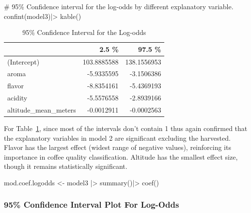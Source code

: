 \documentclass[
  letterpaper,
  DIV=11,
  numbers=noendperiod]{scrartcl}
\newenvironment{Shaded}{\begin{snugshade}}{\end{snugshade}}
\newcommand{\CommentTok}[1]{\textcolor[rgb]{0.37,0.37,0.37}{#1}}
\newcommand{\FunctionTok}[1]{\textcolor[rgb]{0.28,0.35,0.67}{#1}}
\newcommand{\NormalTok}[1]{\textcolor[rgb]{0.00,0.23,0.31}{#1}}
\newcommand{\OtherTok}[1]{\textcolor[rgb]{0.00,0.23,0.31}{#1}}
\newcommand{\SpecialCharTok}[1]{\textcolor[rgb]{0.37,0.37,0.37}{#1}}
\begin{document}
\begin{Shaded}
\begin{Highlighting}[]
\CommentTok{\# 95\% Confidence interval for the log{-}odds by different explanatory variable.}
\FunctionTok{confint}\NormalTok{(model3)}\SpecialCharTok{|\textgreater{}}
  \FunctionTok{kable}\NormalTok{()}
\end{Highlighting}
\end{Shaded}

\begin{longtable}[]{@{}lrr@{}}

\caption{\label{tbl-logoddsCI}95\% Confidence Interval for the Log-odds}

\tabularnewline

\toprule\noalign{}
& 2.5 \% & 97.5 \% \\
\midrule\noalign{}
\endhead
\bottomrule\noalign{}
\endlastfoot
(Intercept) & 103.8885588 & 138.1556953 \\
aroma & -5.9335595 & -3.1506386 \\
flavor & -8.8354161 & -5.4369193 \\
acidity & -5.5576558 & -2.8939166 \\
altitude\_mean\_meters & -0.0012911 & -0.0002563 \\

\end{longtable}

For Table~\ref{tbl-logoddsCI}, since most of the intervals don't contain
1 thus again confirmed that the explanatory variables in model 2 are
significant excluding the harvested. Flavor has the largest effect
(widest range of negative values), reinforcing its importance in coffee
quality classification. Altitude has the smallest effect size, though it
remains statistically significant.

\begin{Shaded}
\begin{Highlighting}[]
\NormalTok{mod.coef.logodds }\OtherTok{\textless{}{-}}\NormalTok{ model3 }\SpecialCharTok{|\textgreater{}}
  \FunctionTok{summary}\NormalTok{()}\SpecialCharTok{|\textgreater{}}
  \FunctionTok{coef}\NormalTok{()}
\end{Highlighting}
\end{Shaded}

\subsubsection{95\% Confidence Interval Plot For
Log-Odds}\label{confidence-interval-plot-for-log-odds}
\end{document}
